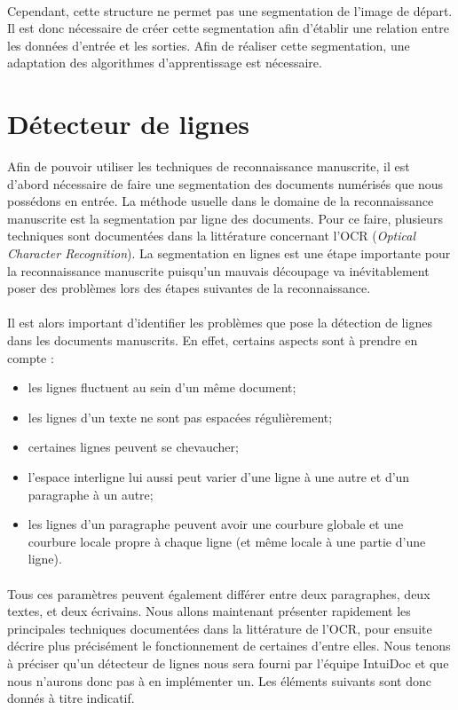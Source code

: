 \paragraph{}
Cependant, cette structure ne permet pas une segmentation de l'image de départ. Il est donc nécessaire de créer
cette segmentation afin d'établir une relation entre les données d'entrée et les sorties. Afin de réaliser cette
segmentation, une adaptation des algorithmes d'apprentissage est nécessaire.

\section{Détecteur de lignes}

Afin de pouvoir utiliser les techniques de reconnaissance manuscrite, il est d'abord nécessaire
de faire une segmentation des documents numérisés que nous possédons en entrée. La méthode
usuelle dans le domaine de la reconnaissance manuscrite est la segmentation par ligne des documents.
Pour ce faire, plusieurs techniques sont documentées dans la littérature concernant l'OCR
(\textit{Optical Character Recognition}). La segmentation en lignes est une étape importante pour
la reconnaissance manuscrite puisqu'un mauvais découpage va inévitablement poser des problèmes
lors des étapes suivantes de la reconnaissance.

\paragraph{}
Il est alors important d'identifier les problèmes que pose la détection de lignes dans les documents manuscrits.
En effet, certains aspects sont à prendre en compte :
\begin{itemize}
\item les lignes fluctuent au sein d'un même document;
\item les lignes d'un texte ne sont pas espacées régulièrement;
\item certaines lignes peuvent se chevaucher;
\item l'espace interligne lui aussi peut varier d'une ligne à une autre et d'un paragraphe à un autre;
\item les lignes d'un paragraphe peuvent avoir une courbure globale et une courbure locale propre à
chaque ligne (et même locale à une partie d'une ligne).
\end{itemize}

\paragraph{}
Tous ces paramètres peuvent également différer entre deux paragraphes, deux textes, et deux écrivains. Nous allons maintenant
présenter rapidement les principales techniques documentées dans la littérature de l'OCR, pour ensuite décrire plus
précisément le fonctionnement de certaines d'entre elles. Nous tenons à préciser qu’un détecteur de lignes nous sera fourni
par l’équipe IntuiDoc et que nous n’aurons donc pas à en implémenter un. Les éléments suivants sont donc donnés à titre indicatif.

